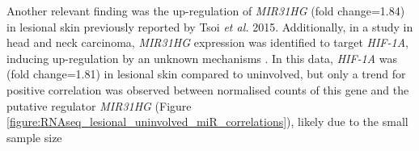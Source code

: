 


Another relevant finding was the up-regulation of \textit{MIR31HG} (fold change=1.84) in lesional skin previously reported by Tsoi \textit{et al.} 2015. Additionally, in a study in head and neck carcinoma, \textit{MIR31HG} expression was identified to target \textit{HIF-1A}, inducing up-regulation by an unknown mechanisms \parencite{Wang2018}. In this data, \textit{HIF-1A} was (fold change=1.81) in lesional skin compared to uninvolved, but only a trend for positive correlation was observed between normalised counts of this gene and the putative regulator \textit{MIR31HG} (Figure \ref{figure:RNAseq_lesional_uninvolved_miR_correlations}), likely due to the small sample size


